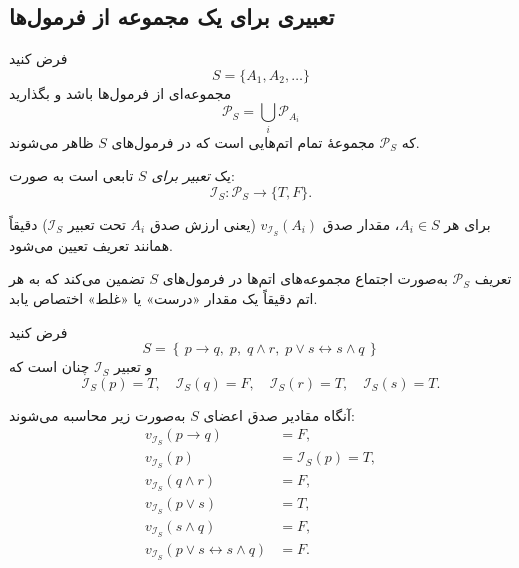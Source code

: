 \subsection*{ تعبیری برای یک مجموعه از فرمول‌ها}
      \begin{definition}[تعریف \lr{2.24}]
        فرض کنید
        \[
        S = \{A_1, A_2, \dots\}
        \]
        مجموعه‌ای از فرمول‌ها باشد و بگذارید
        \[
        \mathscr{P}_S = \bigcup_i \mathscr{P}_{A_i}
        \]
        که $\mathscr{P}_S$ مجموعهٔ تمام اتم‌هایی است که در فرمول‌های $S$ ظاهر می‌شوند.
        
        یک \emph{تعبیر برای $S$} تابعی است به صورت:
        \[
        \mathscr{I}_S : \mathscr{P}_S \to \{T, F\}.
        \]
        
        برای هر $A_i \in S$، مقدار صدق $v_{\mathscr{I}_S}(A_i)$ (یعنی ارزش صدق $A_i$ تحت تعبیر $\mathscr{I}_S$) دقیقاً همانند تعریف  تعیین می‌شود.
        
        تعریف $\mathscr{P}_S$ به‌صورت اجتماع مجموعه‌های اتم‌ها در فرمول‌های $S$ تضمین می‌کند که به هر اتم دقیقاً یک مقدار «درست» یا «غلط» اختصاص یابد.
      \end{definition}
        
      \begin{example}[مثال \lr{2.25}]
        فرض کنید
        \[
        S = \left\{\, p \rightarrow q,\; p,\; q \land r,\; p \lor s \leftrightarrow s \land q \,\right\}
        \]
        و تعبیر $\mathscr{I}_S$ چنان است که
        \[
        \mathscr{I}_S(p) = T, \quad \mathscr{I}_S(q) = F, \quad \mathscr{I}_S(r) = T, \quad \mathscr{I}_S(s) = T.
        \]
        
        آنگاه مقادیر صدق اعضای $S$ به‌صورت زیر محاسبه می‌شوند:
        \[
        \begin{aligned}
        v_{\mathscr{I}_S}(p \rightarrow q) &= F, \\
        v_{\mathscr{I}_S}(p)               &= \mathscr{I}_S(p) = T, \\
        v_{\mathscr{I}_S}(q \land r)       &= F, \\
        v_{\mathscr{I}_S}(p \lor s)        &= T, \\
        v_{\mathscr{I}_S}(s \land q)       &= F, \\
        v_{\mathscr{I}_S}(p \lor s \leftrightarrow s \land q) &= F.
        \end{aligned}
        \]
      \end{example}